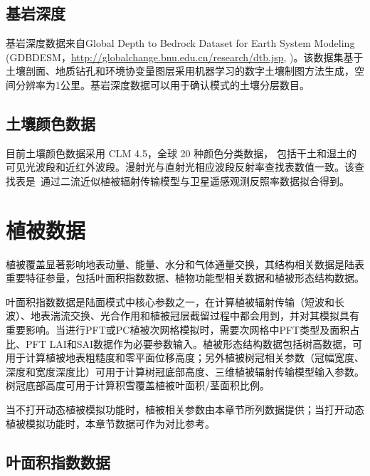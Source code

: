 \subsection{基岩深度}\label{基岩深度}

基岩深度数据来自Global Depth to Bedrock Dataset for Earth System Modeling (GDBDESM，\url{http://globalchange.bnu.edu.cn/research/dtb.jsp}, \citet{shangguan2017mapping})。该数据集基于土壤剖面、地质钻孔和环境协变量图层采用机器学习的数字土壤制图方法生成，空间分辨率为1公里。基岩深度数据可以用于确认模式的土壤分层数目。


\subsection{土壤颜色数据}\label{土壤颜色}
目前土壤颜色数据采用 CLM 4.5，全球 20 种颜色分类数据，
包括干土和湿土的可见光波段和近红外波段。漫射光与直射光相应波段反射率查找表数值一致。该查找表是~\citet{lawrence2007representing}通过二流近似植被辐射传输模型与卫星遥感观测反照率数据拟合得到。


\section{植被数据}\label{植被数据}

植被覆盖显著影响地表动量、能量、水分和气体通量交换，其结构相关数据是陆表重要特征参量，包括叶面积指数数据、植物功能型相关数据和植被形态结构数据。

叶面积指数数据是陆面模式中核心参数之一，在计算植被辐射传输（短波和长波）、地表湍流交换、光合作用和植被冠层截留过程中都会用到，并对其模拟具有重要影响。当进行PFT或PC植被次网格模拟时，需要次网格中PFT类型及面积占比、PFT LAI和SAI数据作为必要参数输入。植被形态结构数据包括树高数据，可用于计算植被地表粗糙度和零平面位移高度；另外植被树冠相关参数（冠幅宽度、深度和宽度深度比）可用于计算树冠底部高度、三维植被辐射传输模型输入参数。树冠底部高度可用于计算积雪覆盖植被叶面积/茎面积比例。

当不打开动态植被模拟功能时，植被相关参数由本章节所列数据提供；当打开动态植被模拟功能时，本章节数据可作为对比参考。


\subsection{叶面积指数数据}\label{叶面积指数数据}

